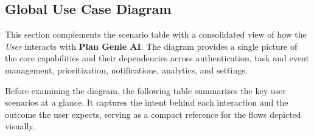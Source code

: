 \documentclass[12pt,a4paper]{article}
\begin{document}
\subsection{Global Use Case Diagram}

This section complements the scenario table with a consolidated view of how the \textit{User} interacts with \textbf{Plan Genie AI}. The diagram provides a single picture of the core capabilities and their dependencies across authentication, task and event management, prioritization, notifications, analytics, and settings.

Before examining the diagram, the following table summarizes the key user scenarios at a glance. It captures the intent behind each interaction and the outcome the user expects, serving as a compact reference for the flows depicted visually.
\end{document}
